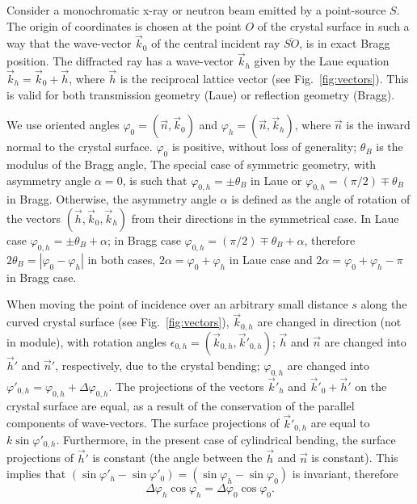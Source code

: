 \documentclass[preprint]{iucr}              %
\begin{document}
Consider a monochromatic x-ray or neutron beam emitted by a point-source $S$. The origin of coordinates is chosen at the point $O$ of the crystal surface in such a way that the wave-vector  ${\vec k_0}$ of the central incident ray $\overline{SO}$, is in exact Bragg  position. The diffracted ray has a wave-vector $\vec k_h$ given by the Laue equation $\vec k_h = \vec k_0 + \vec h$, where $\vec h$ is the reciprocal lattice vector (see Fig.~\ref{fig:vectors}). This is valid for both transmission geometry (Laue) or reflection geometry (Bragg). 

We use oriented angles $\varphi_0 = (\vec n, \vec k_0)$ and $\varphi_h = (\vec n, \vec k_h)$, where $\vec n$ is the inward normal to the crystal surface. $\varphi_0$ is positive, without loss of generality; $\theta_B$ is the modulus of the Bragg angle,
The special case of symmetric geometry, with asymmetry angle $\alpha=0$, is such that $\varphi_{0,h}=\pm\theta_B$ in Laue or $\varphi_{0,h}=(\pi/2)\mp\theta_B$ in Bragg. Otherwise, the asymmetry angle $\alpha$ is defined as the angle of rotation of the vectors $(\vec h, \vec k_0, \vec k_h)$ from their directions in the symmetrical case. 
In Laue case $\varphi_{0,h}=\pm\theta_B+\alpha$; in Bragg case $\varphi_{0,h}=(\pi/2)\mp\theta_B+\alpha$, therefore $2\theta_B=|\varphi_0-\varphi_h|$ in both cases, $2\alpha=\varphi_0+\varphi_h$ in Laue case and $2\alpha=\varphi_0+\varphi_h-\pi$ in Bragg case.

When moving the point of incidence over an arbitrary small distance $s$ along the curved crystal surface (see Fig.~\ref{fig:vectors}), 
$\vec k_{0,h}$ are changed in direction (not in module), with rotation angles $\epsilon_{0,h} = (\vec k_{0,h},\vec k'_{0,h})$; $\vec h$ and $\vec n$ are changed into $\vec h'$ and $\vec n'$, respectively, due to the crystal bending;
$\varphi_{0,h}$ are changed into $\varphi'_{0,h}=\varphi_{0,h}+\Delta \varphi_{0,h}$.
The projections of the vectors $\vec k'_{h}$ and $\vec k'_{0}+\vec h'$ on the crystal surface are equal, as a result of the conservation of the parallel components of wave-vectors. The surface projections of $\vec k'_{0,h}$ 
are equal to $k \sin\varphi'_{0,h}$. Furthermore, in the present case of cylindrical bending, the surface projections of $\vec h'$ is constant (the angle between the $\vec h$ and $\vec n$ is constant).
This implies that $(\sin \varphi'_h - \sin \varphi'_0) = (\sin \varphi_h - \sin \varphi_0)$ is invariant, therefore
\begin{equation}
\label{eq:invariant}
    \Delta \varphi_h \cos\varphi_h = \Delta \varphi_0 \cos\varphi_0.
\end{equation}
\end{document}

